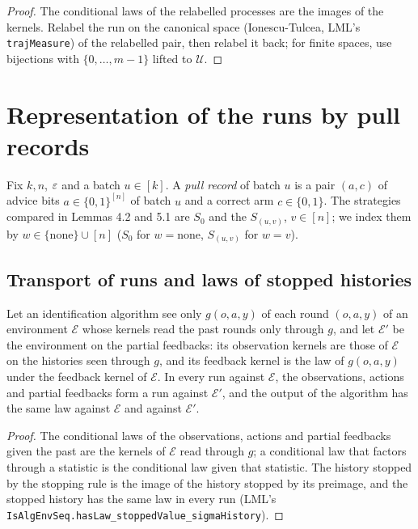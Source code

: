 \begin{proof}
  \leanok
  The conditional laws of the relabelled processes are the images of the kernels. Relabel the run
  on the canonical space (Ionescu-Tulcea, LML's \texttt{trajMeasure}) of the relabelled pair, then
  relabel it back; for finite spaces, use bijections with $\{0, \dots, m - 1\}$ lifted to
  $\mathcal{U}$.
\end{proof}

\section{Representation of the runs by pull records}

Fix $k, n$, $\varepsilon$ and a batch $u \in [k]$. A \emph{pull record} of batch $u$ is a pair $(a, c)$ of
advice bits $a \in \{0,1\}^{[n]}$ of batch $u$ and a correct arm $c \in \{0, 1\}$. The strategies
compared in Lemmas 4.2 and 5.1 are $S_0$ and the $S_{(u, v)}$, $v \in [n]$; we index them by
$w \in \{\mathrm{none}\} \cup [n]$ ($S_0$ for $w = \mathrm{none}$, $S_{(u, v)}$ for $w = v$).

\subsection{Transport of runs and laws of stopped histories}

\begin{lemma}
  \label{lem:partial_feedback_run}
  \leanok
  Let an identification algorithm see only $g(o, a, y)$ of each round $(o, a, y)$ of an
  environment $\mathcal{E}$ whose kernels read the past rounds only through $g$, and let
  $\mathcal{E}'$ be the environment on the partial feedbacks: its observation kernels are those of
  $\mathcal{E}$ on the histories seen through $g$, and its feedback kernel is the law of
  $g(o, a, y)$ under the feedback kernel of $\mathcal{E}$. In every run against $\mathcal{E}$, the
  observations, actions and partial feedbacks form a run against $\mathcal{E}'$, and the output of
  the algorithm has the same law against $\mathcal{E}$ and against $\mathcal{E}'$.
\end{lemma}

\begin{proof}
  \leanok
  The conditional laws of the observations, actions and partial feedbacks given the past are the
  kernels of $\mathcal{E}$ read through $g$; a conditional law that factors through a statistic is
  the conditional law given that statistic. The history stopped by the stopping rule is the image of
  the history stopped by its preimage, and the stopped history has the same law in every run (LML's
  \texttt{IsAlgEnvSeq.hasLaw\_stoppedValue\_sigmaHistory}).
\end{proof}

